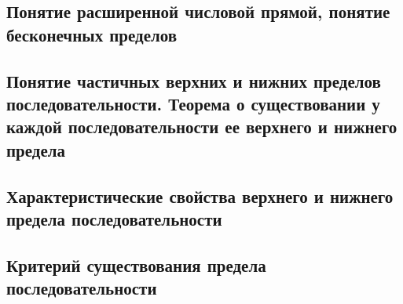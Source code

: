 \subsection{Понятие расширенной числовой прямой, понятие бесконечных пределов}
\subsection{Понятие частичных верхних и нижних пределов последовательности. Теорема о существовании у каждой последовательности ее верхнего и нижнего предела}
\subsection{Характеристические свойства верхнего и нижнего предела последовательности}

\subsection{Критерий существования предела последовательности}



